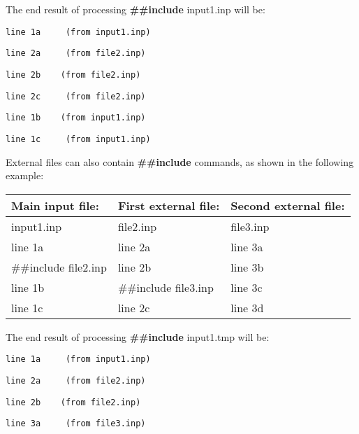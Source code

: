 The end result of processing \textbf{\#\#include} input1.inp will be:

\begin{lstlisting}
line 1a     (from input1.inp)
\end{lstlisting}

\begin{lstlisting}
line 2a     (from file2.inp)
\end{lstlisting}

\begin{lstlisting}
line 2b    (from file2.inp)
\end{lstlisting}

\begin{lstlisting}
line 2c     (from file2.inp)
\end{lstlisting}

\begin{lstlisting}
line 1b    (from input1.inp)
\end{lstlisting}

\begin{lstlisting}
line 1c     (from input1.inp)
\end{lstlisting}

External files can also contain \textbf{\#\#include} commands, as shown in the following example:

\begin{longtable}[c]{@{}lll@{}}
\toprule 
Main input file: & First external file: & Second external file: \tabularnewline \midrule
\endhead
input1.inp & file2.inp & file3.inp \tabularnewline
line 1a & line 2a & line 3a \tabularnewline
\#\#include file2.inp & line 2b & line 3b \tabularnewline
line 1b & \#\#include file3.inp & line 3c \tabularnewline
line 1c & line 2c & line 3d \tabularnewline
\bottomrule
\end{longtable}

The end result of processing \textbf{\#\#include} input1.tmp will be:

\begin{lstlisting}
line 1a     (from input1.inp)
\end{lstlisting}

\begin{lstlisting}
line 2a     (from file2.inp)
\end{lstlisting}

\begin{lstlisting}
line 2b    (from file2.inp)
\end{lstlisting}

\begin{lstlisting}
line 3a     (from file3.inp)
\end{lstlisting}

